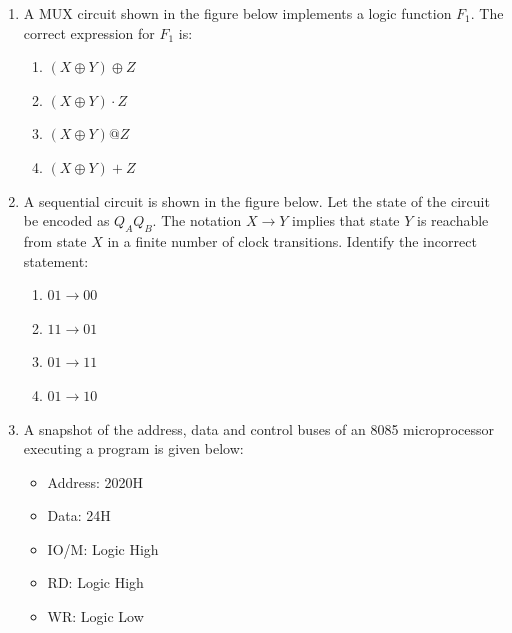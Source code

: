 \documentclass[journal]{IEEEtran}
\begin{document}
\begin{enumerate}
\begin{multicols}{2}
\begin{enumerate}
    \item $X_1Y_1 + Y_1Y_0 + X_1X_0$
    \item $Y_1X_1 + Y_0X_1X_0 + Y_1Y_0X_0$
    \item $X_1Y_1 + X_1Y_0Y_1 + X_0X_1Y_0$
    \item None of the above
\end{enumerate}
\end{multicols}



\item A MUX circuit shown in the figure below implements a logic function $F_1$. The correct expression for $F_1$ is:

\begin{multicols}{2}
\begin{enumerate}
    \item $(X \oplus Y) \oplus Z$
    \item $(X \oplus Y) \cdot Z$
    \item $(X \oplus Y) @ Z$
    \item $(X \oplus Y) + Z$
\end{enumerate}
\end{multicols}

\item A sequential circuit is shown in the figure below. Let the state of the circuit be encoded as $Q_AQ_B$. The notation $X \rightarrow Y$ implies that state $Y$ is reachable from state $X$ in a finite number of clock transitions. Identify the incorrect statement:

\begin{multicols}{2}
\begin{enumerate}
    \item $01 \rightarrow 00$
    \item $11 \rightarrow 01$
    \item $01 \rightarrow 11$
    \item $01 \rightarrow 10$
\end{enumerate}
\end{multicols}

\item A snapshot of the address, data and control buses of an 8085 microprocessor executing a program is given below:

\begin{itemize}
    \item Address: 2020H
    \item Data: 24H
    \item IO/M: Logic High
    \item RD: Logic High
    \item WR: Logic Low
\end{itemize}


\end{enumerate}
\end{document}
